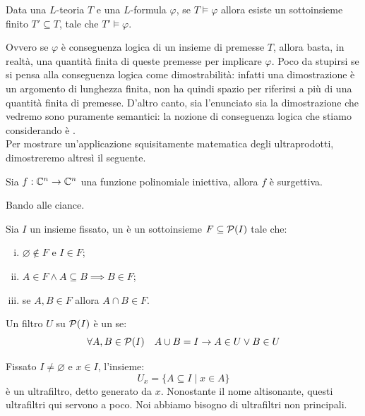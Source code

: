 \begin{theorem}
    Data una $L$-teoria $T$ e una $L$-formula $\varphi$, se $T \models \varphi$ allora esiste un sottoinsieme finito $T' \subseteq T$,
    tale che $T' \models \varphi$.
\end{theorem}

Ovvero se $\varphi$ è conseguenza logica di un insieme di premesse $T$, allora basta, in realtà, una quantità finita di queste premesse per implicare $\varphi$.
Poco da stupirsi se si pensa alla conseguenza logica come dimostrabilità: infatti una dimostrazione  è 
un argomento di lunghezza finita, non ha quindi spazio per riferirsi a più di una quantità finita di premesse. D'altro canto, sia l'enunciato sia la dimostrazione che vedremo sono puramente semantici:
la nozione di conseguenza logica che stiamo considerando è .\\
Per mostrare un'applicazione squisitamente matematica degli ultraprodotti, dimostreremo altresì il seguente.

\begin{theorem}
    [Ax-Grothendieck]
    Sia $f : \mathbb C^n \to \mathbb C^n$ una funzione polinomiale iniettiva, allora $f$ è surgettiva.
\end{theorem}

Bando alle ciance.

\begin{definition}
    Sia $I$ un insieme fissato, un  è un sottoinsieme $F \subseteq \mathcal{P}(I)$ tale che:
    \begin{enumerate}[(i)]
        \item $\varnothing \notin F$ e $I \in F$;
        \item $A \in F \land A \subseteq B \implies B \in F$;
        \item se $A,B \in F$ allora $A \cap B \in F$.
    \end{enumerate}
    Un filtro $U$ su $\mathcal{P}(I)$ è un  se:
    \[ \forall A,B \in \mathcal{P}(I) \quad A \cup B = I \to A \in U \lor B \in U
    \]
\end{definition}

\begin{example}
    Fissato $I \ne \varnothing$ e $x \in I$, l'insieme:
    \[ U_x = \{ A \subseteq I \mid x \in A \}
    \]
    è un ultrafiltro, detto  generato da $x$. Nonostante il nome altisonante, questi ultrafiltri qui servono a poco.
    Noi abbiamo bisogno di ultrafiltri non principali.
\end{example}

